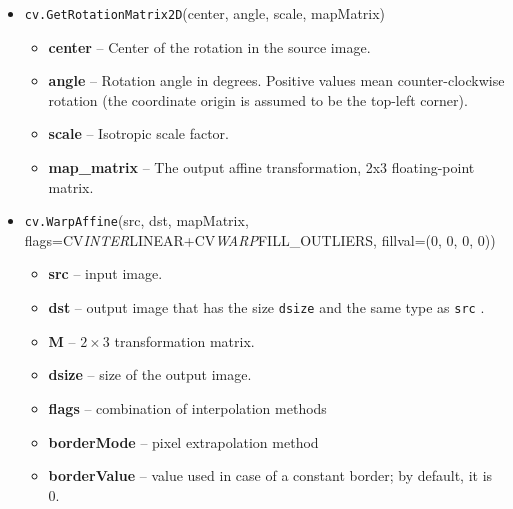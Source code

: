 \documentclass[11pt]{ctexart}
\begin{document}
    
    
    \begin{itemize}
        \item
          \texttt{cv.GetRotationMatrix2D}(center, angle, scale, mapMatrix)
          \begin{itemize}
          \item
            \textbf{center} -- Center of the rotation in the source image.
          \item
            \textbf{angle} -- Rotation angle in degrees. Positive values mean
            counter-clockwise rotation (the coordinate origin is assumed to be
            the top-left corner).
          \item
            \textbf{scale} -- Isotropic scale factor.
          \item
            \textbf{map\_matrix} -- The output affine transformation, 2x3
            floating-point matrix.
          \end{itemize}
    \end{itemize}
    
    
    \begin{itemize}
    \item
      \texttt{cv.WarpAffine}(src, dst, mapMatrix,
      flags=CV\emph{INTER}LINEAR+CV\emph{WARP}FILL\_OUTLIERS, fillval=(0, 0,
      0, 0))
      \begin{itemize}
      \item
        \textbf{src} -- input image.
      \item
        \textbf{dst} -- output image that has the size \texttt{dsize} and
        the same type as \texttt{src} .
      \item
        \textbf{M} -- \(2 \times 3\) transformation matrix.
      \item
        \textbf{dsize} -- size of the output image.
      \item
        \textbf{flags} -- combination of interpolation methods
      \item
        \textbf{borderMode} -- pixel extrapolation method
      \item
        \textbf{borderValue} -- value used in case of a constant border; by
        default, it is 0.
        \end{itemize}  
    \end{itemize}
\end{document}
